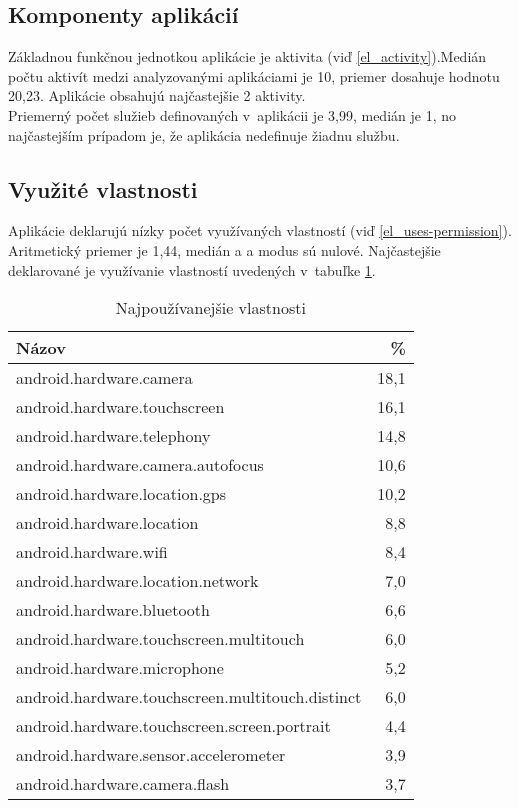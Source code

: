 \subsection{Komponenty aplikácií}
Základnou funkčnou jednotkou aplikácie je aktivita (viď \ref{el_activity}).Medián počtu aktivít medzi analyzovanými aplikáciami je  10, priemer dosahuje hodnotu 20,23. Aplikácie obsahujú najčastejšie 2 aktivity.\\Priemerný počet služieb definovaných v~aplikácii je 3,99, medián je 1, no najčastejším prípadom je, že aplikácia nedefinuje žiadnu službu.

\subsection{Využité vlastnosti}
Aplikácie deklarujú nízky počet využívaných vlastností (viď \ref{el_uses-permission}). Aritmetický priemer je 1,44, medián a a modus sú nulové. Najčastejšie deklarované je využívanie vlastností uvedených v~tabuľke \ref{tab:features}.
\begin{table}[htb]
\centering
  \begin{tabular}{|l r|}
    \hline
    \textbf{Názov} & \textbf{\%} \\\hline\hline
    android.hardware.camera & 18,1 \\
    android.hardware.touchscreen & 16,1 \\
    android.hardware.telephony & 14,8 \\
    android.hardware.camera.autofocus & 10,6 \\
    android.hardware.location.gps & 10,2 \\
    android.hardware.location & 8,8 \\
    android.hardware.wifi & 8,4 \\
    android.hardware.location.network & 7,0\\
    android.hardware.bluetooth & 6,6\\
    android.hardware.touchscreen.multitouch & 6,0\\
    android.hardware.microphone & 5,2\\
    android.hardware.touchscreen.multitouch.distinct & 6,0\\
    android.hardware.touchscreen.screen.portrait & 4,4\\
    android.hardware.sensor.accelerometer & 3,9\\
    android.hardware.camera.flash & 3,7\\
    \hline
  \end{tabular}
  \caption{Najpoužívanejšie vlastnosti}
  \label{tab:features}
\end{table}

